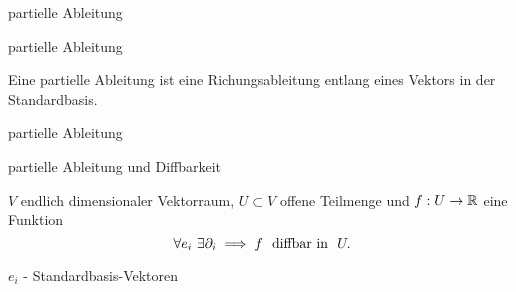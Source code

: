 \documentclass[class=article, crop=false]{standalone}
\begin{document}
\begin{zettel}{partielle Ableitung}
\begin{flashcard}{partielle Ableitung}
	\begin{definition}
		Eine partielle Ableitung ist eine Richungsableitung entlang eines Vektors in der Standardbasis.
	\end{definition}
\end{flashcard}

\begin{flashcard}[xpx9n6tc]{partielle Ableitung}
	\begin{question}
		partielle Ableitung und Diffbarkeit
	\end{question}
	\begin{theorem}
		$V$ endlich dimensionaler Vektorraum, $U \subset  V$ offene Teilmenge und $f: U \to  \mathbb{R} $ eine Funktion
		\[
			\forall e_i \exists \partial _i \implies f \tx{ diffbar in } U
		.\]

		$e_i$ - Standardbasis-Vektoren
	\end{theorem}
\end{flashcard}

\end{zettel}
\end{document}
